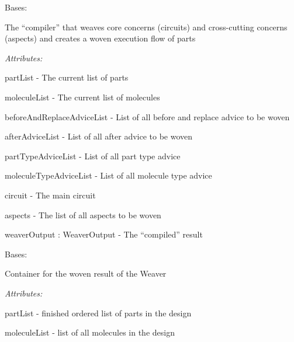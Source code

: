 \documentclass[letterpaper,10pt,english]{sphinxmanual}
\begin{document}
\begin{fulllineitems}
\label{modules/index:aosb.core.Weaver}
Bases: 

The ``compiler'' that weaves core concerns (circuits) and cross-cutting
concerns (aspects) and creates a woven execution flow of parts

\begin{DUlineblock}{0em}
\item[] \emph{Attributes:}
\item[]
\begin{DUlineblock}{\DUlineblockindent}
\item[] partList - The current list of parts
\item[] moleculeList - The current list of molecules
\item[] beforeAndReplaceAdviceList - List of all before and replace advice to be woven
\item[] afterAdviceList - List of all after advice to be woven
\item[] partTypeAdviceList - List of all part type advice
\item[] moleculeTypeAdviceList - List of all molecule type advice
\item[] circuit - The main circuit
\item[] aspects - The list of all aspects to be woven
\item[] weaverOutput : WeaverOutput - The ``compiled'' result
\end{DUlineblock}
\end{DUlineblock}

\begin{fulllineitems}
\label{modules/index:aosb.core.Weaver.WeaverOutput}
Bases: 

Container for the woven result of the Weaver

\begin{DUlineblock}{0em}
\item[] \emph{Attributes:}
\item[]
\begin{DUlineblock}{\DUlineblockindent}
\item[] partList - finished ordered list of parts in the design
\item[] moleculeList - list of all molecules in the design
\end{DUlineblock}
\end{DUlineblock}


\end{fulllineitems}
\end{fulllineitems}
\end{document}
